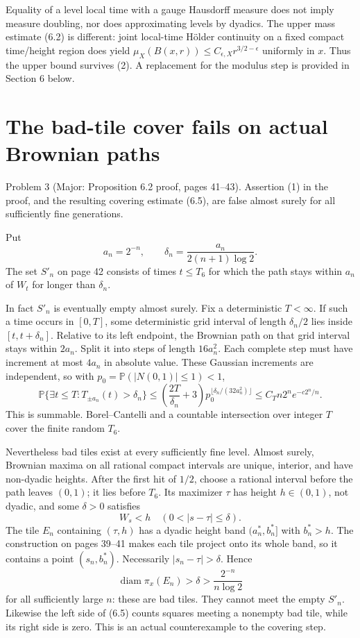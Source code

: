 \documentclass[10pt]{article}
\begin{document}
Equality of a level local time with a gauge Hausdorff measure does not imply measure doubling, nor does approximating levels by dyadics. The upper mass estimate (6.2) is different: joint local-time Hölder continuity on a fixed compact time/height region does yield \(\mu_X(B(x,r))\le C_{\epsilon,X}r^{3/2-\epsilon}\) uniformly in \(x\). Thus the upper bound survives (2). A replacement for the modulus step is provided in Section 6 below.\par
\section*{The bad-tile cover fails on actual Brownian paths}
Problem 3 (Major: Proposition 6.2 proof, pages 41–43).  Assertion (1) in the proof, and the resulting covering estimate (6.5), are false almost surely for all sufficiently fine generations.\par
Put \[a_n=2^{-n},\qquad
 \delta_n=\frac{a_n}{2(n+1)\log2}.\] The set \(S'_n\) on page 42 consists of times \(t\le T_6\) for which the path stays within \(a_n\) of \(W_t\) for longer than \(\delta_n\).\par
In fact \(S'_n\) is eventually empty almost surely. Fix a deterministic \(T<\infty\). If such a time occurs in \([0,T]\), some deterministic grid interval of length \(\delta_n/2\) lies inside \([t,t+\delta_n]\). Relative to its left endpoint, the Brownian path on that grid interval stays within \(2a_n\). Split it into steps of length \(16a_n^2\). Each complete step must have increment at most \(4a_n\) in absolute value. These Gaussian increments are independent, so with \(p_0=\mathbb P(|N(0,1)|\le1)<1\), \[\mathbb P\{\exists t\le T:T_{\pm a_n}(t)>\delta_n\}
 \le
 \left(\frac{2T}{\delta_n}+3\right)
 p_0^{\lfloor\delta_n/(32a_n^2)\rfloor}
 \le C_T n2^n e^{-c2^n/n}.
 \tag{3}\] This is summable. Borel–Cantelli and a countable intersection over integer \(T\) cover the finite random \(T_6\).\par
Nevertheless bad tiles exist at every sufficiently fine level. Almost surely, Brownian maxima on all rational compact intervals are unique, interior, and have non-dyadic heights. After the first hit of \(1/2\), choose a rational interval before the path leaves \((0,1)\); it lies before \(T_6\). Its maximizer \(\tau\) has height \(h\in(0,1)\), not dyadic, and some \(\delta>0\) satisfies \[W_s<h\quad(0<|s-\tau|\le\delta).\] The tile \(E_n\) containing \((\tau,h)\) has a dyadic height band \((a_n^*,b_n^*]\) with \(b_n^*>h\). The construction on pages 39–41 makes each tile project onto its whole band, so it contains a point \((s_n,b_n^*)\). Necessarily \(|s_n-\tau|>\delta\). Hence \[\operatorname{diam}\pi_x(E_n)>\delta>
 \frac{2^{-n}}{n\log2}\] for all sufficiently large \(n\): these are bad tiles. They cannot meet the empty \(S'_n\). Likewise the left side of (6.5) counts squares meeting a nonempty bad tile, while its right side is zero. This is an actual counterexample to the covering step.\par
\end{document}
